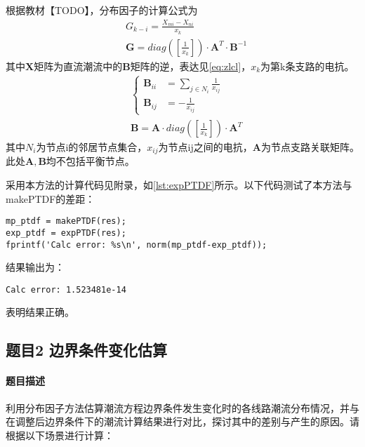 \documentclass[a4paper,12pt]{article}
\newcommand{\vect}[1]{\boldsymbol{#1}}
\begin{document}
    根据教材【TODO】，分布因子的计算公式为
    \begin{equation}
      \label{eq:fbyz}
      \begin{aligned}
        &G_{k-i}=\frac{X_{mi}-X_{ni}}{x_k}\\
        &\vect{G}= diag(\left[\frac{1}{x_k}\right])\cdot \vect{A}^T \cdot \vect{B}^{-1}
      \end{aligned}
    \end{equation}
    其中$\vect{X}$矩阵为直流潮流中的$\vect{B}$矩阵的逆，表达见\cref{eq:zlcl}，$x_k$为第k条支路的电抗。
    \begin{equation}
      \label{eq:zlcl}
      \begin{aligned}
        &\begin{cases}
          \vect{B}_{ii}&=\sum_{j\in N_i}\frac{1}{x_{ij}}\\
          \vect{B}_{ij}&=-\frac{1}{x_{ij}}
        \end{cases}\\
        &\vect{B}=\vect{A}\cdot diag(\left[\frac{1}{x_k}\right]) \cdot \vect{A}^T
      \end{aligned}
    \end{equation}
    其中$N_i$为节点i的邻居节点集合，$x_{ij}$为节点ij之间的电抗，$\vect{A}$为节点支路关联矩阵。此处$\vect{A},\vect{B}$均不包括平衡节点。

    采用本方法的计算代码见附录，如\cref{lst:expPTDF}所示。以下代码测试了本方法与makePTDF的差距：
    \begin{lstlisting}[style=Matlab-editor,basicstyle=\mlttfamily]
%% PTDF
mp_ptdf = makePTDF(res);
exp_ptdf = expPTDF(res);
fprintf('Calc error: %s\n', norm(mp_ptdf-exp_ptdf));
    \end{lstlisting}
    结果输出为：
    \begin{lstlisting}[style=Matlab-editor,basicstyle=\mlttfamily]
Calc error: 1.523481e-14
    \end{lstlisting}
    表明结果正确。

    \subsection{题目2 边界条件变化估算}
    \paragraph{题目描述} 利用分布因子方法估算潮流方程边界条件发生变化时的各线路潮流分布情况，并与在调整后边界条件下的潮流计算结果进行对比，探讨其中的差别与产生的原因。请根据以下场景进行计算：
\end{document}
